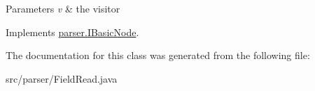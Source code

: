 \begin{DoxyParams}{Parameters}
{\em v} & the visitor \\
\hline
\end{DoxyParams}


Implements \hyperlink{interfaceparser_1_1_i_basic_node_af8790b7076c59e00781ba3d4118757cd}{parser.\+I\+Basic\+Node}.



The documentation for this class was generated from the following file\+:\begin{DoxyCompactItemize}
\item 
src/parser/Field\+Read.\+java\end{DoxyCompactItemize}
